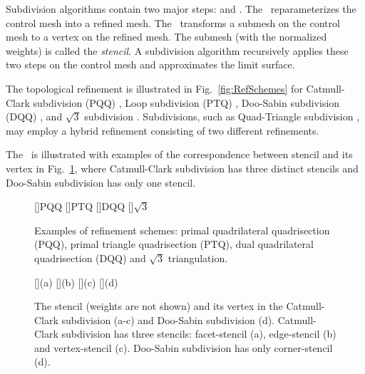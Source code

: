 

Subdivision algorithms \cite{Warren:subdivision, Sub:course:2000} 
contain two major steps: \emph{\tr} and \emph{\gm}.
The \tr\ reparameterizes the control mesh into a refined 
mesh. The \gm\ transforms a submesh on the control mesh
to a vertex on the refined mesh. The submesh (with
the normalized weights) is called the
\emph{stencil}. A subdivision algorithm recursively 
applies these two steps on the control mesh and approximates
the limit surface. 

The topological refinement is illustrated 
in Fig.~\ref{fig:RefSchemes} for Catmull-Clark
subdivision (PQQ) \cite{cc}, Loop subdivision (PTQ) \cite{loop},
Doo-Sabin subdivision (DQQ) \cite{ds}, and $\sqrt{3}$ subdivision
\cite{sqrt3}. Subdivisions, such as Quad-Triangle subdivision 
\cite{qts,l-pg-03}, may employ a hybrid refinement consisting
of two different refinements.

The \gm\ is illustrated with examples of the correspondence between
stencil and its vertex in Fig.~\ref{fig:RefMap}, where Catmull-Clark
subdivision has three distinct stencils and Doo-Sabin subdivision has
only one stencil. 

\begin{figure}[htb]
  \centering
  []{\scriptsize PQQ} 
  []{\scriptsize PTQ}
  []{\scriptsize DQQ} 
  []{\scriptsize $\sqrt{3}$} 
  \caption{Examples of refinement schemes: 
    primal quadrilateral quadrisection (PQQ),
    primal triangle quadrisection (PTQ),
    dual quadrilateral quadrisection (DQQ) and
    $\sqrt{3}$ triangulation.}
  \label{fig:RefSchemes}
  []{(a)}
  []{(b)}
  []{(c)}
  []{(d)}
  \caption{The stencil (weights are not shown) and its 
           vertex in the Catmull-Clark subdivision (a-c)
           and Doo-Sabin subdivision (d). Catmull-Clark
           subdivision has three stencils: facet-stencil (a), 
           edge-stencil (b) and vertex-stencil (c). 
           Doo-Sabin subdivision has only corner-stencil (d).}
  \label{fig:RefMap}
\end{figure}


